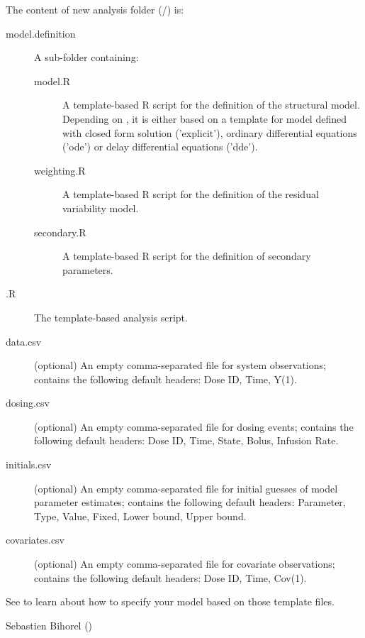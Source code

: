 \begin{Details}\relax
The content of new  analysis folder (/)
is:\begin{description}

\item[model.definition] A sub-folder containing: \begin{description}

\item[model.R] A template-based R script for the definition of the
structural model. Depending on , it is either based on
a template for model defined with closed form solution ('explicit'),
ordinary differential equations ('ode') or delay differential
equations ('dde').
\item[weighting.R] A template-based R script for the definition of the
residual variability model.
\item[secondary.R] A template-based R script for the definition of
secondary parameters.

\end{description}


\item[.R] The template-based  analysis script.
\item[data.csv] (optional) An empty comma-separated file for system
observations; contains the following default headers: Dose ID, Time,
Y(1).
\item[dosing.csv] (optional) An empty comma-separated file for dosing
events; contains the following default headers: Dose ID, Time, State,
Bolus, Infusion Rate.
\item[initials.csv] (optional) An empty comma-separated file for initial
guesses of model parameter estimates; contains the following default
headers: Parameter, Type, Value, Fixed, Lower bound, Upper bound.
\item[covariates.csv] (optional) An empty comma-separated file for covariate
observations; contains the following default headers: Dose ID, Time,
Cov(1).

\end{description}

See  to learn about how to
specify your model based on those template files.
\end{Details}
%
\begin{Author}\relax
Sebastien Bihorel ()
\end{Author}
